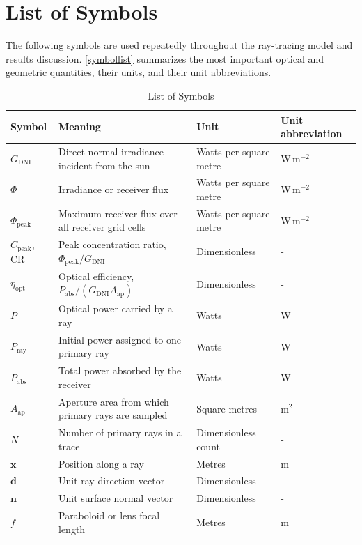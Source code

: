 \section*{List of Symbols}
\label{section:symbols}

The following symbols are used repeatedly throughout the ray-tracing model and results
discussion. \autoref{symbollist} summarizes the most important optical and geometric
quantities, their units, and their unit abbreviations.

\begin{table}[H]
\centering
\caption{List of Symbols}
\label{symbollist}
\begin{tabular}[t]{m{}m{}m{}m{}}
\toprule
\textbf{Symbol} & \textbf{Meaning} & \textbf{Unit} & \textbf{Unit abbreviation} \\
\midrule
$G_\mathrm{DNI}$ & Direct normal irradiance incident from the sun & Watts per square metre & W\,m$^{-2}$ \\
$\Phi$ & Irradiance or receiver flux & Watts per square metre & W\,m$^{-2}$ \\
$\Phi_\mathrm{peak}$ & Maximum receiver flux over all receiver grid cells & Watts per square metre & W\,m$^{-2}$ \\
$C_\mathrm{peak}$, CR & Peak concentration ratio, $\Phi_\mathrm{peak}/G_\mathrm{DNI}$ & Dimensionless & - \\
$\eta_\mathrm{opt}$ & Optical efficiency, $P_\mathrm{abs}/(G_\mathrm{DNI}A_\mathrm{ap})$ & Dimensionless & - \\
$P$ & Optical power carried by a ray & Watts & W \\
$P_\mathrm{ray}$ & Initial power assigned to one primary ray & Watts & W \\
$P_\mathrm{abs}$ & Total power absorbed by the receiver & Watts & W \\
$A_\mathrm{ap}$ & Aperture area from which primary rays are sampled & Square metres & m$^2$ \\
$N$ & Number of primary rays in a trace & Dimensionless count & - \\
$\mathbf{x}$ & Position along a ray & Metres & m \\
$\mathbf{d}$ & Unit ray direction vector & Dimensionless & - \\
$\mathbf{n}$ & Unit surface normal vector & Dimensionless & - \\
$f$ & Paraboloid or lens focal length & Metres & m \\

\end{tabular}
\end{table}
